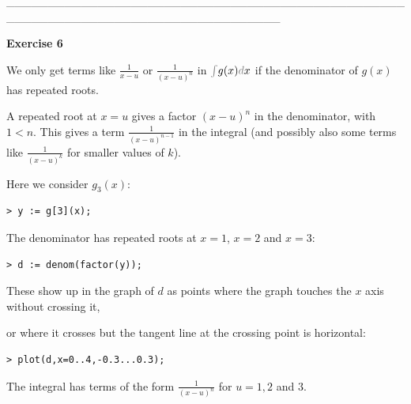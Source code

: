 \documentclass{article}
\begin{document}
\begin{Maple Normal}
\_\_\_\_\_\_\_\_\_\_\_\_\_\_\_\_\_\_\_\_\_\_\_\_\_\_\_\_\_\_\_\_\_\_\_\_\_\_\_\_\_\_\_\_\_\_\_\_\_\_\_\_\_\_\_\_\_\_\_\_\_\_\_\_\_\_\_\_\_\_\_\_\_\_\_\_\_\_\_\_\_
\end{Maple Normal}
\begin{Maple Heading 2}
\textbf{Exercise 6}
\end{Maple Heading 2}
\begin{Maple Normal}
We only get terms like 
$\frac{1}{x -u}$ or 
$\frac{1}{(x -u)^{n}}$ in 
$\textcolor{gray}{\int}g (x)\textcolor{gray}{d}x$ if the denominator of 
$g (x)$ has repeated roots.
\end{Maple Normal}
\begin{Maple Normal}

\end{Maple Normal}
\begin{Maple Normal}
A repeated root at 
$x =u$ gives a factor 
$(x -u)^{n}$ in the denominator, with 
$1<n$.  This gives a term 
$\frac{1}{(x -u)^{n -1}}$ in the integral (and possibly also some terms like 
$\frac{1}{(x -u)^{k}}$ for smaller values of 
$k$).
\end{Maple Normal}
\begin{Maple Normal}

\end{Maple Normal}
\begin{Maple Normal}
Here we consider 
$g_{3}(x)$:
\end{Maple Normal}
\begin{lstlisting}
> y := g[3](x);
\end{lstlisting}
\begin{Maple Normal}
The denominator has repeated roots at 
$x =1$, 
$x =2$ and 
$x =3$:
\end{Maple Normal}
\begin{lstlisting}
> d := denom(factor(y));
\end{lstlisting}
\begin{Maple Normal}
These show up in the graph of 
$d$ as points where the graph touches the 
$x$ axis without crossing it,\

or where it crosses but the tangent line at the crossing point is horizontal: 
\end{Maple Normal}
\begin{lstlisting}
> plot(d,x=0..4,-0.3...0.3);
\end{lstlisting}
\begin{Maple Normal}
The integral has terms of the form 
$\frac{1}{(x -u)^{n}}$ for 
$u =1,2$ and 
$3$.
\end{Maple Normal}
\end{document}

